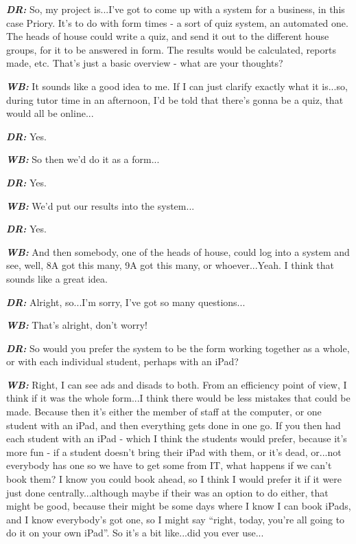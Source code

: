 \textit{\textbf{DR:}} So, my project is...I've got to come up with a system for a business, in this case Priory. It's to do with form times - a sort of quiz system, an automated one. The heads of house could write a quiz, and send it out to the different house groups, for it to be answered in form. The results would be calculated, reports made, etc. That's just a basic overview - what are your thoughts?

\textit{\textbf{WB:}} It sounds like a good idea to me. If I can just clarify exactly what it is...so, during tutor time in an afternoon, I'd be told that there's gonna be a quiz, that would all be online...

\textit{\textbf{DR:}} Yes.

\textit{\textbf{WB:}} So then we'd do it as a form...

\textit{\textbf{DR:}} Yes.

\textit{\textbf{WB:}} We'd put our results into the system...

\textit{\textbf{DR:}} Yes.

\textit{\textbf{WB:}} And then somebody, one of the heads of house, could log into a system and see, well, 8A got this many, 9A got this many, or whoever...Yeah. I think that sounds like a great idea.

\textit{\textbf{DR:}} Alright, so...I'm sorry, I've got so many questions...

\textit{\textbf{WB:}} That's alright, don't worry!

\textit{\textbf{DR:}} So would you prefer the system to be the form working together as a whole, or with each individual student, perhaps with an iPad?

\textit{\textbf{WB:}} Right, I can see ads and disads to both. From an efficiency point of view, I think if it was the whole form...I think there would be less mistakes that could be made. Because then it's either the member of staff at the computer, or one student with an iPad, and then everything gets done in one go. If you then had each student with an iPad - which I think the students would prefer, because it's more fun - if a student doesn't bring their iPad with them, or it's dead, or...not everybody has one so we have to get some from IT, what happens if we can't book them? I know you could book ahead, so I think I would prefer it if it were just done centrally...although maybe if their was an option to do either, that might be good, because their might be some days where I know I can book iPads, and I know everybody's got one, so I might say ``right, today, you're all going to do it on your own iPad''. So it's a bit like...did you ever use...

